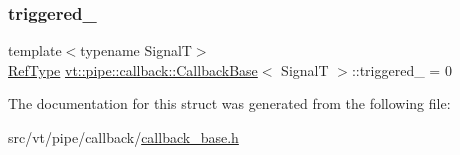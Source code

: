 \subsubsection{\texorpdfstring{triggered\+\_\+}{triggered\_}}
{\footnotesize\ttfamily template$<$typename SignalT$>$ \\
\hyperlink{namespacevt_a9b39ce9494bb04674d0d5b895a5aa50f}{Ref\+Type} \hyperlink{structvt_1_1pipe_1_1callback_1_1_callback_base}{vt\+::pipe\+::callback\+::\+Callback\+Base}$<$ SignalT $>$\+::triggered\+\_\+ = 0\hspace{0.3cm}{\ttfamily [private]}}



The documentation for this struct was generated from the following file\+:\begin{DoxyCompactItemize}
\item 
src/vt/pipe/callback/\hyperlink{callback__base_8h}{callback\+\_\+base.\+h}\end{DoxyCompactItemize}
